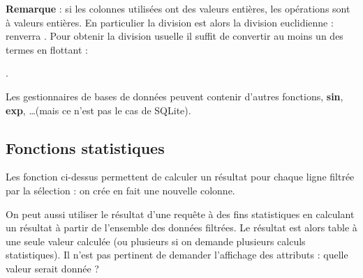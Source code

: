 {\bf Remarque} : si les colonnes utilisées ont des valeurs entières, les opérations sont à valeurs entières. En particulier la division est alors la division euclidienne :  renverra . Pour obtenir la division usuelle il suffit de convertir au moins un des termes en flottant : 

.

\medskip

Les gestionnaires de bases de données peuvent contenir d'autres fonctions, {\bf sin}, {\bf exp}, \dots (mais ce n'est pas le cas de SQLite).
\subsection{Fonctions statistiques}
Les fonction ci-dessus permettent de calculer un résultat pour chaque ligne filtrée par la sélection : on crée en fait une nouvelle colonne. 

On peut aussi utiliser le résultat d'une requête à des fins statistiques en calculant un résultat à partir de l'ensemble des données filtrées. Le résultat est alors table à une seule valeur calculée (ou plusieurs si on demande plusieurs calculs statistiques). Il n'est pas pertinent de demander l'affichage des attributs : quelle valeur serait donnée ?

